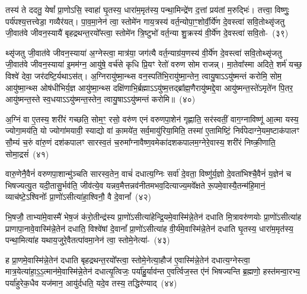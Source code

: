 तस्य॑ ते ददतु॒ येषां᳚ प्रा॒णो\-ऽसि॒ स्वाहा॑ घृ॒तस्य॒ धारा॑म॒मृत॑स्य॒ पन्था॒मिन्द्रे॑ण द॒त्तां प्रय॑तां म॒रुद्भिः॑। तत्त्वा॒ विष्णुः॒ पर्य॑पश्य॒त्तत्त्वेडा॒ गव्यैर॑यत्। पा॒व॒मा॒नेन॑ त्वा॒ स्तोमे॑न गाय॒त्रस्य॑ वर्त॒न्योपा॒ꣳ॒शोर्वी॒र्ये॑ण दे॒वस्त्वा॑ सवि॒तोथ्सृ॑जतु जी॒वात॑वे जीवन॒स्यायै॑ बृहद्रथन्त॒रयो᳚स्त्वा॒ स्तोमे॑न त्रि॒ष्टुभो॑ वर्त॒न्या शु॒क्रस्य॑ वी॒र्ये॑ण दे॒वस्त्वा॑ सवि॒तो-~(३९)\ip

थ्सृ॑जतु जी॒वात॑वे जीवन॒स्याया॑ अ॒ग्नेस्त्वा॒ मात्र॑या॒ जग॑त्यै वर्त॒न्याग्र॑य॒णस्य॑ वी॒र्ये॑ण दे॒वस्त्वा॑ सवि॒तोथ्सृ॑जतु जी॒वात॑वे जीवन॒स्याया॑ इ॒मम॑ग्न॒ आयु॑षे॒ वर्च॑से कृधि प्रि॒यꣳ रेतो॑ वरुण सोम राजन्न्। मा॒तेवा᳚स्मा अदिते॒ शर्म॑ यच्छ॒ विश्वे॑ देवा॒ जर॑दष्टि॒र्यथा\-ऽ\-स॑त्। अ॒ग्निरायु॑ष्मा॒न्थ्स वन॒स्पति॑भि॒रायु॑ष्मा॒न्तेन॒ त्वायु॒षा\-ऽऽ\-यु॑ष्मन्तं करोमि॒ सोम॒ आयु॑ष्मा॒न्थ्स ओष॑धीभिर्य॒ज्ञ आयु॑ष्मा॒न्थ्स दक्षि॑णाभि॒र्ब्रह्मा\-ऽऽ\-यु॑ष्म॒त्तद्ब्रा᳚ह्म॒णैरायु॑ष्मद्दे॒वा आयु॑ष्मन्त॒स्ते॑\-ऽमृते॑न पि॒तर॒ आयु॑ष्मन्त॒स्ते स्व॒धया\-ऽऽ\-यु॑ष्मन्त॒स्तेन॒ त्वायु॒षा\-ऽऽ\-यु॑ष्मन्तं करोमि॥~(४०)\ip

{\anuvakamend[{विश्वे॑षां दे॒वानां᳚ प्रा॒णो॑\-ऽसि त्रि॒ष्टुभो॑ वर्त॒न्या शु॒क्रस्य॑ वी॒र्ये॑ण दे॒वस्त्वा॑ सवि॒तोथ्सोम॒ आयु॑ष्मा॒न्पञ्च॑विꣳशतिश्च}]}%

अ॒ग्निं वा ए॒तस्य॒ शरी॑रं गच्छति॒ सोम॒ꣳ॒ रसो॒ वरु॑ण एनं वरुणपा॒शेन॑ गृह्णाति॒ सर॑स्वतीं॒ वाग॒ग्नाविष्णू॑ आ॒त्मा यस्य॒ ज्योगा॒मय॑ति॒ यो ज्योगा॑मयावी॒ स्याद्यो वा॑ का॒मये॑त॒ सर्व॒मायु॑रिया॒मिति॒ तस्मा॑ ए॒तामिष्टिं॒ निर्व॑पेदाग्ने॒यम॒ष्टाक॑पालꣳ सौ॒म्यं च॒रुं वा॑रु॒णं दश॑\-कपालꣳ सारस्व॒तं च॒रुमा᳚ग्नावैष्ण॒वमेका॑\-दश\-कपालम॒ग्नेरे॒वास्य॒ शरी॑रं निष्क्री॒णाति॒ सोमा॒द्रसं॑~(४१)\ip

वारु॒णेनै॒वैनं॑ वरुणपा॒शान्मु॑ञ्चति सारस्व॒तेन॒ वाचं॑ दधात्य॒ग्निः सर्वा॑ दे॒वता॒ विष्णु॑र्य॒ज्ञो दे॒वता॑भिश्चै॒वैनं॑ य॒ज्ञेन॑ च भिषज्यत्यु॒त यदी॒तासु॒र्भव॑ति॒ जीव॑त्ये॒व यन्नव॒मैत्तन्नव॑नीतमभव॒दित्याज्य॒मवे᳚क्षते रू॒पमे॒वास्यै॒तन्म॑हि॒मानं॒ व्याच॑ष्टे॒\-ऽश्विनोः᳚ प्रा॒णो॑\-ऽसीत्या॑हा॒श्विनौ॒ वै दे॒वानां᳚~(४२)\ip

भि॒षजौ॒ ताभ्या॑मे॒वास्मै॑ भेष॒जं क॑रो॒तीन्द्र॑स्य प्रा॒णो॑\-ऽसीत्या॑हेन्द्रि॒यमे॒वास्मि॑न्ने॒तेन॑ दधाति मि॒त्रावरु॑णयोः प्रा॒णो॑\-ऽसीत्या॑ह प्राणापा॒नावे॒वास्मि॑न्ने॒तेन॑ दधाति॒ विश्वे॑षां दे॒वानां᳚ प्रा॒णो॑\-ऽसीत्या॑ह वी॒र्य॑मे॒वास्मि॑न्ने॒तेन॑ दधाति घृ॒तस्य॒ धारा॑म॒मृत॑स्य॒ पन्था॒मित्या॑ह यथाय॒जुरे॒वैतत्पा॑वमा॒नेन॑ त्वा॒ स्तोमे॒नेत्या॑-~(४३)\ip

ह प्रा॒णमे॒वास्मि॑न्ने॒तेन॑ दधाति बृहद्रथन्त॒रयो᳚स्त्वा॒ स्तोमे॒नेत्या॒हौज॑ ए॒वास्मि॑न्ने॒तेन॑ दधात्य॒ग्नेस्त्वा॒ मात्र॒येत्या॑\-हा॒\-ऽ॒\-ऽ॒\-त्मान॑\-मे॒वास्मि॑न्ने॒तेन॑ दधात्यृ॒त्विजः॒ पर्या॑हु॒र्याव॑न्त ए॒वर्त्विज॒स्त ए॑नं भिषज्यन्ति ब्र॒ह्मणो॒ हस्त॑मन्वा॒रभ्य॒ पर्या॑हुरेक॒धैव यज॑मान॒ आयु॑र्दधति॒ यदे॒व तस्य॒ तद्धिर॑ण्याद्~(४४)\ip

